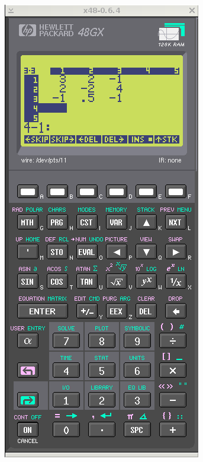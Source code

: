 \documentclass[11pt]{article}
\begin{document}
\bigskip
\includegraphics[scale,height=0.33\textheight]{20180422143232-linear01-p1.png}
~
\end{document}
